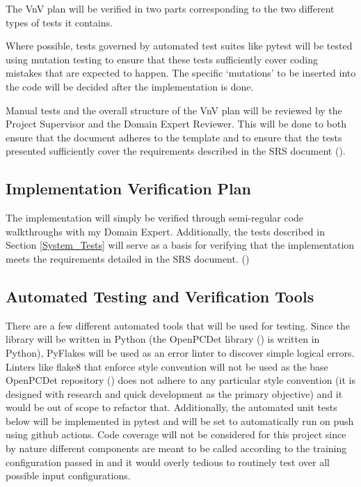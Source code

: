 \documentclass[12pt, titlepage]{article}
\begin{document}
The VnV plan will be verified in two parts corresponding to the two different 
types of tests it contains. 

Where possible, tests governed by automated test suites
like pytest will be tested using mutation testing to ensure that these tests sufficiently
cover coding mistakes that are expected to happen. The specific `mutations' to be inserted
into the code will be decided after the implementation is done. 

Manual tests and the overall structure of the VnV plan will be reviewed by the Project Supervisor
and the Domain Expert Reviewer. This will be done to both ensure that the document adheres to the
template and to ensure that the tests presented sufficiently cover the requirements described in
the SRS document (\cite{SRS}).

\subsection{Implementation Verification Plan} \label{imple_ver}

The implementation will simply be verified through semi-regular code walkthroughs with my Domain Expert.
Additionally, the tests described in Section \ref{System_Tests} will serve as a basis for verifying that the 
implementation meets the requirements detailed in the SRS document. (\cite{SRS})

\subsection{Automated Testing and Verification Tools}

There are a few different automated tools that will be used for testing.
Since the library will be written in Python (the OpenPCDet library (\cite{openpcdet2020})
is written in Python), PyFlakes will be used as an error linter to discover
simple logical errors. Linters like flake8 that enforce style convention will
not be used as the base OpenPCDet repository (\cite{openpcdet2020}) does not adhere to any particular
style convention (it is designed with research and quick development as the primary
objective) and it would be out of scope to refactor that. Additionally, the automated
unit tests below will be implemented in pytest and will be set to automatically run
on push using github actions. Code coverage will not be considered for this project
since by nature different components are meant to be called according to the training
configuration passed in and it would overly tedious to routinely test over all possible
input configurations.
\end{document}
